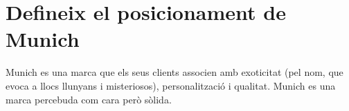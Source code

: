 \section{Defineix el posicionament de Munich}

Munich es una marca que els seus clients associen amb exoticitat
(pel nom, que evoca a llocs llunyans i misteriosos), personalització
i qualitat. Munich es una marca percebuda com cara però sòlida.
